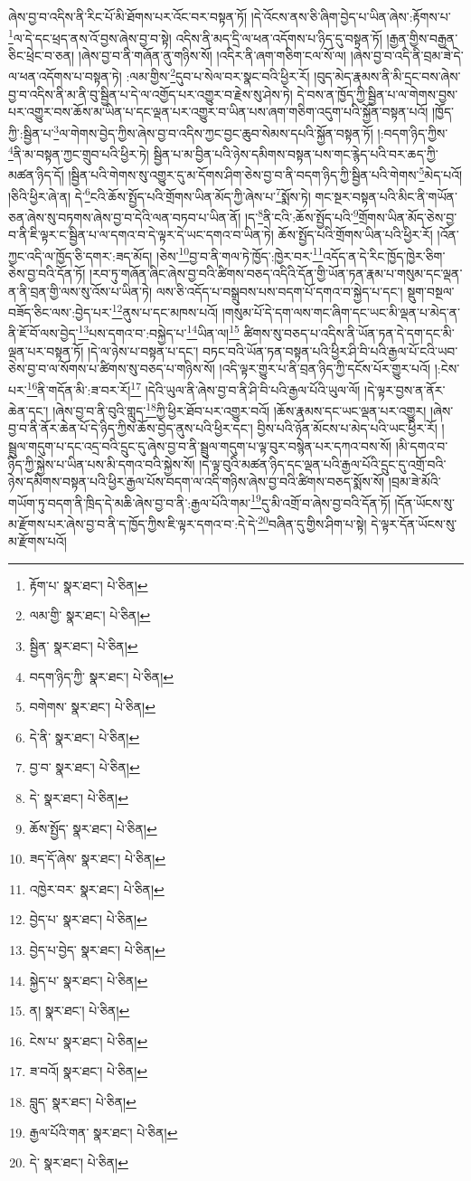 ཞེས་བྱ་བ་འདིས་ནི་རིང་པོ་མི་ཐོགས་པར་འོང་བར་བསྟན་ཏོ། །དེ་འོངས་ནས་ཅི་ཞིག་བྱེད་པ་ཡིན་ཞེས་:རྟོགས་པ་\footnote{རྟོག་པ་  སྣར་ཐང་།  པེ་ཅིན། }ལ་དེ་དང་ཕྲད་ནས་འོ་བྱས་ཞེས་བྱ་བ་སྟེ། འདིས་ནི་མད་དྲི་ལ་ཕན་འདོགས་པ་ཉིད་དུ་བསྟན་ཏོ། །རྒྱན་གྱིས་བརྒྱན་ཅིང་ཕྲེང་བ་ཅན། །ཞེས་བྱ་བ་ནི་གཞོན་ནུ་གཉིས་སོ། །འདིར་ནི་ཞག་གཅིག་ངལ་སོ་ལ། །ཞེས་བྱ་བ་འདི་ནི་བྲམ་ཟེ་དེ་ལ་ཕན་འདོགས་པ་བསྟན་ཏེ། :ལམ་གྱིས་\footnote{ལམ་གྱི་  སྣར་ཐང་།  པེ་ཅིན། }དུབ་པ་སེལ་བར་སྣང་བའི་ཕྱིར་རོ། །བུད་མེད་རྣམས་ནི་མི་དྲང་བས་ཞེས་བྱ་བ་འདིས་ནི་མ་ནི་བུ་སྦྱིན་པ་དེ་ལ་འགྱོད་པར་འགྱུར་བ་རྗེས་སུ་ཤེས་ཏེ། དེ་བས་ན་ཁྱོད་ཀྱི་སྦྱིན་པ་ལ་གེགས་བྱས་པར་འགྱུར་བས་ཆོས་མ་ཡིན་པ་དང་ལྡན་པར་འགྱུར་བ་ཡིན་པས་ཞག་གཅིག་འདུག་པའི་སྐྱོན་བསྟན་པའོ། །ཁྱོད་ཀྱི་:སྦྱིན་པ་\footnote{སྦྱིན་  སྣར་ཐང་།  པེ་ཅིན། }ལ་གེགས་བྱེད་ཀྱིས་ཞེས་བྱ་བ་འདིས་ཀྱང་བྱང་ཆུབ་སེམས་དཔའི་སྐྱོན་བསྟན་ཏོ། །:བདག་ཉིད་ཀྱིས་\footnote{བདག་ཉིད་ཀྱི་  སྣར་ཐང་།  པེ་ཅིན། }ནི་མ་བསྟན་ཀྱང་གྲུབ་པའི་ཕྱིར་ཏེ། སྦྱིན་པ་མ་བྱིན་པའི་ཉེས་དམིགས་བསྟན་པས་གང་རྙེད་པའི་བར་ཆད་ཀྱི་མཚན་ཉིད་དོ། །སྦྱིན་པའི་གེགས་སུ་འགྱུར་དུ་མ་དོགས་ཤིག་ཅེས་བྱ་བ་ནི་བདག་ཉིད་ཀྱི་སྦྱིན་པའི་གེགས་\footnote{བགེགས་  སྣར་ཐང་།  པེ་ཅིན། }མེད་པའོ། །ཅིའི་ཕྱིར་ཞེ་ན། དེ་\footnote{དེ་ནི་  སྣར་ཐང་།  པེ་ཅིན། }ངའི་ཆོས་སྤྱོད་པའི་གྲོགས་ཡིན་མོད་ཀྱི་ཞེས་པ་\footnote{བྱ་བ་  སྣར་ཐང་།  པེ་ཅིན། }སྨོས་ཏེ། གང་སྔར་བསྟན་པའི་མིང་ནི་གཡོན་ཅན་ཞེས་སུ་བཏགས་ཞེས་བྱ་བ་དེའི་ལན་བཏབ་པ་ཡིན་ནོ། །ད་\footnote{དེ་  སྣར་ཐང་།  པེ་ཅིན། }ནི་ངའི་:ཆོས་སྤྱོད་པའི་\footnote{ཆོས་སྤྱོད་  སྣར་ཐང་།  པེ་ཅིན། }གྲོགས་ཡིན་མོད་ཅེས་བྱ་བ་ནི་ཇི་ལྟར་ང་སྦྱིན་པ་ལ་དགའ་བ་དེ་ལྟར་དེ་ཡང་དགའ་བ་ཡིན་ཏེ། ཆོས་སྤྱོད་པའི་གྲོགས་ཡིན་པའི་ཕྱིར་རོ། །འོན་ཀྱང་འདི་ལ་ཁྱོད་ཅི་དགར་:ཟད་མོད། །ཅེས་\footnote{ཟད་དོ་ཞེས་  སྣར་ཐང་།  པེ་ཅིན། }བྱ་བ་ནི་གལ་ཏེ་ཁྱོད་:ཁྱེར་བར་\footnote{འཁྱེར་བར་  སྣར་ཐང་།  པེ་ཅིན། }འདོད་ན་དེ་རིང་ཁྱོད་ཁྱེར་ཅིག་ཅེས་བྱ་བའི་དོན་ཏོ། །རབ་ཏུ་གཞོན་ཞིང་ཞེས་བྱ་བའི་ཚིགས་བཅད་འདིའི་དོན་གྱི་ཡོན་ཏན་རྣམ་པ་གསུམ་དང་ལྡན་ན་ནི་བྲན་གྱི་ལས་སུ་འོས་པ་ཡིན་ཏེ། ལས་ཅི་འདོད་པ་བསྒྲུབས་པས་བདག་པོ་དགའ་བ་སྐྱེད་པ་དང་། སྡུག་བསྔལ་བཟོད་ཅིང་ལས་:བྱེད་པར་\footnote{བྱེད་པ་  སྣར་ཐང་།  པེ་ཅིན། }ནུས་པ་དང་མཁས་པའོ། །གསུམ་པོ་དེ་དག་ལས་གང་ཞིག་དང་ཡང་མི་ལྡན་པ་མེད་ན་ནི་ཇོ་བོ་ལས་བྱེད་\footnote{བྱེད་པ་བྱེད་  སྣར་ཐང་།  པེ་ཅིན། }པས་དགའ་བ་:བསྐྱེད་པ་\footnote{སྐྱེད་པ་  སྣར་ཐང་།  པེ་ཅིན། }ཡིན་ལ།\footnote{ན།  སྣར་ཐང་།  པེ་ཅིན། } ཚིགས་སུ་བཅད་པ་འདིས་ནི་ཡོན་ཏན་དེ་དག་དང་མི་ལྡན་པར་བསྟན་ཏོ། །དེ་ལ་ཉེས་པ་བསྟན་པ་དང་། བཏང་བའི་ཡོན་ཏན་བསྟན་པའི་ཕྱིར་ཤི་བི་པའི་རྒྱལ་པོ་ངའི་ཡབ་ཅེས་བྱ་བ་ལ་སོགས་པ་ཚིགས་སུ་བཅད་པ་གཉིས་སོ། །འདི་ལྟར་གྱུར་པ་ནི་བྲན་ཉིད་ཀྱི་དངོས་པོར་གྱུར་པའོ། །:ངེས་པར་\footnote{ངེས་པ་  སྣར་ཐང་།  པེ་ཅིན། }ནི་གདོན་མི་:ཟ་བར་རོ།\footnote{ཟ་བའོ།  སྣར་ཐང་།  པེ་ཅིན། } །དེའི་ཡུལ་ནི་ཞེས་བྱ་བ་ནི་ཤི་བི་པའི་རྒྱལ་པོའི་ཡུལ་ལོ། །དེ་ལྟར་བྱས་ན་ནོར་ཆེན་དང་། །ཞེས་བྱ་བ་ནི་བུའི་གླུད་\footnote{བླུད་  སྣར་ཐང་།  པེ་ཅིན། }ཀྱི་ཕྱིར་ཐོབ་པར་འགྱུར་བའོ། །ཆོས་རྣམས་དང་ཡང་ལྡན་པར་འགྱུར། །ཞེས་བྱ་བ་ནི་ནོར་ཆེན་པོ་དེ་ཉིད་ཀྱིས་ཆོས་བྱེད་ནུས་པའི་ཕྱིར་དང་། བྱིས་པའི་ཉོན་མོངས་པ་མེད་པའི་ཡང་ཕྱིར་རོ། །སྦྲུལ་གདུག་པ་དང་འདྲ་བའི་དྲུང་དུ་ཞེས་བྱ་བ་ནི་སྦྲུལ་གདུག་པ་ལྟ་བུར་བསྙེན་པར་དཀའ་བས་སོ། །མི་དགའ་བ་ཉིད་ཀྱི་སྐྱེས་པ་ཡིན་པས་མི་དགའ་བའི་སྐྱེས་སོ། །དེ་ལྟ་བུའི་མཚན་ཉིད་དང་ལྡན་པའི་རྒྱལ་པོའི་དྲུང་དུ་འགྲོ་བའི་ཉེས་དམིགས་བསྟན་པའི་ཕྱིར་རྒྱལ་པོས་བདག་ལ་འདི་གཉིས་ཞེས་བྱ་བའི་ཚིགས་བཅད་སྨོས་སོ། །བྲམ་ཟེ་མོའི་གཡོག་ཏུ་བདག་ནི་ཁྲིད་དེ་མཆི་ཞེས་བྱ་བ་ནི་:རྒྱལ་པོའི་གམ་\footnote{རྒྱལ་པོའི་གན་  སྣར་ཐང་།  པེ་ཅིན། }དུ་མི་འགྲོ་བ་ཞེས་བྱ་བའི་དོན་ཏོ། །དོན་ཡོངས་སུ་མ་རྫོགས་པར་ཞེས་བྱ་བ་ནི་ད་ཁྱོད་ཀྱིས་ཇི་ལྟར་དགའ་བ་:དེ་དེ་\footnote{དེ་  སྣར་ཐང་།  པེ་ཅིན། }བཞིན་དུ་གྱིས་ཤིག་པ་སྟེ། དེ་ལྟར་དོན་ཡོངས་སུ་མ་རྫོགས་པའོ། 
